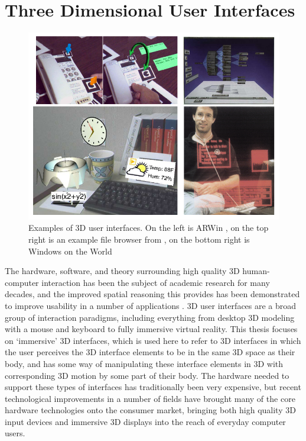 \section{Three Dimensional User Interfaces}

\begin{figure}[ht!]
\centering
\includegraphics[width=1.0\textwidth]{images/3dui-examples.png}
\caption{Examples of 3D user interfaces. On the left is ARWin \protect\cite{arwin}, on the top right is an example file browser from \protect\cite{info-vis}, on the bottom right is Windows on the World \protect\cite{wotw}}
\label{fig:3dui-example}
\end{figure}

The hardware, software, and theory surrounding high quality 3D human-computer interaction has been the subject of academic research for many decades, and the improved spatial reasoning this provides has been demonstrated to improve usability in a  number of applications  \cite{bowman_theory_practice}. 3D user interfaces are a broad group of interaction paradigms, including everything from desktop 3D modeling with a mouse and keyboard to fully immersive virtual reality.  This thesis focuses on ‘immersive' 3D interfaces, which is used here to refer to 3D interfaces in which the user perceives the 3D interface elements to be in the same 3D space as their body, and has some way of manipulating these interface elements in 3D with corresponding 3D motion by some part of their body.  The hardware needed to support these types of interfaces has traditionally been very expensive, but recent technological improvements in a number of fields have brought many of the core hardware technologies onto the consumer market, bringing both high quality 3D input devices and immersive 3D displays into the reach of everyday computer users.


